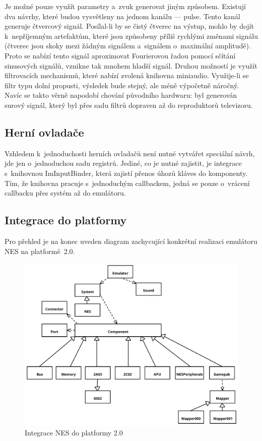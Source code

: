 Je možné pouze využít parametry a~zvuk generovat jiným způsobem. Existují dva návrhy, které budou vysvětleny na jednom kanálu --- pulse. Tento kanál generuje čtvercový signál. Posílal-li by se čistý čtverec na výstup, mohlo by dojít k~nepříjemným artefaktům, které jsou způsobeny příliš rychlými změnami signálu (čtverec jsou skoky mezi žádným signálem a~signálem o~maximální amplitudě). Proto se nabízí tento signál aproximovat Fourierovou řadou pomocí sčítání sinusových signálů, vznikne tak mnohem hladší signál. Druhou možností je využít filtrovacích mechanismů, které nabízí zvolená knihovna miniaudio. Využije-li se filtr typu dolní propusti, výsledek bude stejný, ale méně výpočetně náročný. Navíc se takto věrně napodobí chování původního hardwaru: byl generován surový signál, který byl přes sadu filtrů dopraven až do reproduktorů televizoru.

\subsection{Herní ovladače}
Vzhledem k~jednoduchosti herních ovladačů není nutné vytvářet speciální návrh, jde jen o~jednoduchou sadu registrů. Jediné, co je nutné zajistit, je integrace s~knihovnou ImInputBinder, která zajistí přenos úhozů kláves do komponenty. Tím, že knihovna pracuje s~jednoduchým callbackem, jedná se pouze o~vrácení callbacku přes systém až do emulátoru.

\subsection{Integrace do platformy}
Pro přehled je na konec uveden diagram zachycující konkrétní realizaci emulátoru NES na platformě~2.0.

\begin{figure}[htp!]
	\centering
	\caption{Integrace NES do platformy 2.0}\label{fig:navrh-prehled}
	\includegraphics[width=1.0\textwidth]{images/navrh_prehled.pdf}
\end{figure}



